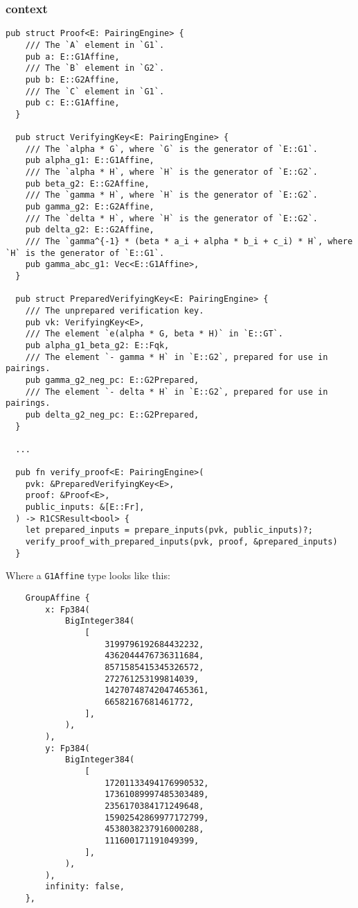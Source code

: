 \documentclass{article}
\begin{document}
\subsubsection{context}
\begin{lstlisting}[rust]
  pub struct Proof<E: PairingEngine> {
    /// The `A` element in `G1`.
    pub a: E::G1Affine,
    /// The `B` element in `G2`.
    pub b: E::G2Affine,
    /// The `C` element in `G1`.
    pub c: E::G1Affine,
  }

  pub struct VerifyingKey<E: PairingEngine> {
    /// The `alpha * G`, where `G` is the generator of `E::G1`.
    pub alpha_g1: E::G1Affine,
    /// The `alpha * H`, where `H` is the generator of `E::G2`.
    pub beta_g2: E::G2Affine,
    /// The `gamma * H`, where `H` is the generator of `E::G2`.
    pub gamma_g2: E::G2Affine,
    /// The `delta * H`, where `H` is the generator of `E::G2`.
    pub delta_g2: E::G2Affine,
    /// The `gamma^{-1} * (beta * a_i + alpha * b_i + c_i) * H`, where `H` is the generator of `E::G1`.
    pub gamma_abc_g1: Vec<E::G1Affine>,
  }

  pub struct PreparedVerifyingKey<E: PairingEngine> {
    /// The unprepared verification key.
    pub vk: VerifyingKey<E>,
    /// The element `e(alpha * G, beta * H)` in `E::GT`.
    pub alpha_g1_beta_g2: E::Fqk,
    /// The element `- gamma * H` in `E::G2`, prepared for use in pairings.
    pub gamma_g2_neg_pc: E::G2Prepared,
    /// The element `- delta * H` in `E::G2`, prepared for use in pairings.
    pub delta_g2_neg_pc: E::G2Prepared,
  }
  
  ...
  
  pub fn verify_proof<E: PairingEngine>(
    pvk: &PreparedVerifyingKey<E>,
    proof: &Proof<E>,
    public_inputs: &[E::Fr],
  ) -> R1CSResult<bool> {
    let prepared_inputs = prepare_inputs(pvk, public_inputs)?;
    verify_proof_with_prepared_inputs(pvk, proof, &prepared_inputs)
  }

\end{lstlisting}

Where a \lstinline{G1Affine} type looks like this:

\begin{lstlisting}
    GroupAffine {
        x: Fp384(
            BigInteger384(
                [
                    3199796192684432232,
                    4362044476736311684,
                    8571585415345326572,
                    272761253199814039,
                    14270748742047465361,
                    66582167681461772,
                ],
            ),
        ),
        y: Fp384(
            BigInteger384(
                [
                    17201133494176990532,
                    17361089997485303489,
                    2356170384171249648,
                    15902542869977172799,
                    4538038237916000288,
                    111600171191049399,
                ],
            ),
        ),
        infinity: false,
    },

\end{lstlisting}
\end{document}
